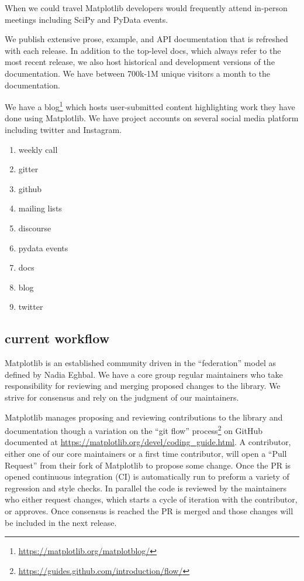 \documentclass[12pt]{article}
\numberwithin{page}{section}
\begin{document}
When we could travel Matplotlib developers would frequently attend
in-person meetings including SciPy and PyData events.

We publish extensive prose, example, and API
documentation that is
refreshed with each release.  In addition to the top-level docs, which
always refer to the most recent release, we also host historical and
development versions of the documentation.  We have between 700k-1M
unique visitors a month to the documentation.

We have a blog\footnote{\url{https://matplotlib.org/matplotblog/}}
which hosts user-submitted content highlighting work they have done
using Matplotlib.  We have project accounts on several social media platform
including twitter and Instagram.




\begin{enumerate}
\item weekly call
\item gitter
\item github
\item mailing lists
\item discourse
\item pydata events
\item docs
\item blog
\item twitter
\end{enumerate}

\subsection{current workflow}

Matplotlib is an established community driven in the ``federation''
model as defined by Nadia Eghbal\cite{eghbal_2020}.  We have a core
group regular maintainers who take responsibility for reviewing and
merging proposed changes to the library.  We strive for consensus and
rely on the judgment of our maintainers.

Matplotlib manages proposing and reviewing contributions to the
library and documentation though a variation on the ``git flow''
process\footnote{\url{https://guides.github.com/introduction/flow/}}
on GitHub documented at
\url{https://matplotlib.org/devel/coding_guide.html}.  A contributor,
either one of our core maintainers or a first time contributor, will
open a ``Pull Request'' from their fork of Matplotlib to propose some
change.  Once the PR is opened continuous integration (CI) is
automatically run to preform a variety of regression and style checks.
In parallel the code is reviewed by the maintainers who either request
changes, which starts a cycle of iteration with the contributor, or
approves.  Once consensus is reached the PR is merged and those
changes will be included in the next release.
\end{document}
